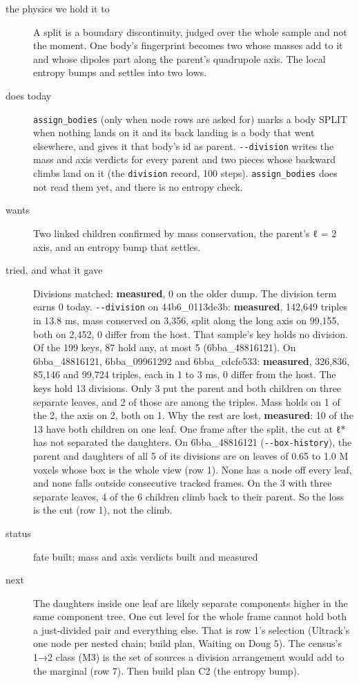 \begin{description}
\item[{the physics we hold it to}] A split is a boundary discontinuity, judged over the whole sample and not the moment. One body's fingerprint becomes two whose masses add to it and whose dipoles part along the parent's quadrupole axis. The local entropy bumps and settles into two lows.
\item[{does today}] \texttt{assign\_\allowbreak{}bodies} (only when node rows are asked for) marks a body SPLIT when nothing lands on it and its back landing is a body that went elsewhere, and gives it that body's id as parent. \texttt{-\allowbreak{}-\allowbreak{}division} writes the mass and axis verdicts for every parent and two pieces whose backward climbs land on it (the \texttt{division} record, 100 steps). \texttt{assign\_\allowbreak{}bodies} does not read them yet, and there is no entropy check.
\item[{wants}] Two linked children confirmed by mass conservation, the parent's ℓ = 2 axis, and an entropy bump that settles.
\item[{tried, and what it gave}] Divisions matched: \textbf{measured}, 0 on the older dump. The division term earns 0 today. \texttt{-\allowbreak{}-\allowbreak{}division} on 44b6\_\allowbreak{}0113de3b: \textbf{measured}, 142,649 triples in 13.8 ms, mass conserved on 3,356, split along the long axis on 99,155, both on 2,452, 0 differ from the host. That sample's key holds no division. Of the 199 keys, 87 hold any, at most 5 (6bba\_\allowbreak{}48816121). On 6bba\_\allowbreak{}48816121, 6bba\_\allowbreak{}09961292 and 6bba\_\allowbreak{}cdcfe533: \textbf{measured}, 326,836, 85,146 and 99,724 triples, each in 1 to 3 ms, 0 differ from the host. The keys hold 13 divisions. Only 3 put the parent and both children on three separate leaves, and 2 of those are among the triples. Mass holds on 1 of the 2, the axis on 2, both on 1. Why the rest are lost, \textbf{measured}: 10 of the 13 have both children on one leaf. One frame after the split, the cut at ℓ* has not separated the daughters. On 6bba\_\allowbreak{}48816121 (\texttt{-\allowbreak{}-\allowbreak{}box-\allowbreak{}history}), the parent and daughters of all 5 of its divisions are on leaves of 0.65 to 1.0 M voxels whose box is the whole view (row 1). None has a node off every leaf, and none falls outside consecutive tracked frames. On the 3 with three separate leaves, 4 of the 6 children climb back to their parent. So the loss is the cut (row 1), not the climb.
\item[{status}] fate built; mass and axis verdicts built and measured
\item[{next}] The daughters inside one leaf are likely separate components higher in the same component tree. One cut level for the whole frame cannot hold both a just-divided pair and everything else. That is row 1's selection (Ultrack's one node per nested chain; build plan, Waiting on Doug 5). The census's 1→2 class (M3) is the set of sources a division arrangement would add to the marginal (row 7). Then build plan C2 (the entropy bump).
\end{description}


